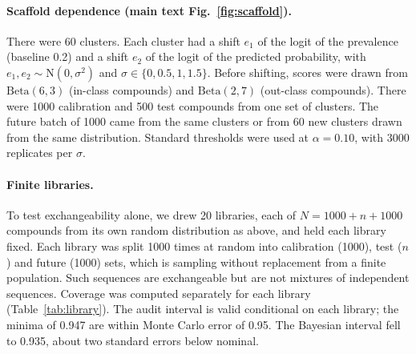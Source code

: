 \documentclass[10pt]{article}
\begin{document}


\paragraph{Scaffold dependence (main text Fig.~\ref{fig:scaffold}).} There were 60 clusters. Each cluster had a shift $e_1$ of the logit of the prevalence (baseline 0.2) and a shift $e_2$ of the logit of the predicted probability, with $e_1,e_2\sim\mathrm N(0,\sigma^2)$ and $\sigma\in\{0,0.5,1,1.5\}$. Before shifting, scores were drawn from $\mathrm{Beta}(6,3)$ (in-class compounds) and $\mathrm{Beta}(2,7)$ (out-class compounds). There were 1000 calibration and 500 test compounds from one set of clusters. The future batch of 1000 came from the same clusters or from 60 new clusters drawn from the same distribution. Standard thresholds were used at $\alpha=0.10$, with 3000 replicates per $\sigma$.

\paragraph{Finite libraries.} To test exchangeability alone, we drew 20 libraries, each of $N=1000+n+1000$ compounds from its own random distribution as above, and held each library fixed. Each library was split 1000 times at random into calibration (1000), test ($n$) and future (1000) sets, which is sampling without replacement from a finite population. Such sequences are exchangeable but are not mixtures of independent sequences.\citep{DiaconisFreedman1980} Coverage was computed separately for each library (Table~\ref{tab:library}). The audit interval is valid conditional on each library; the minima of 0.947 are within Monte Carlo error of 0.95. The Bayesian interval fell to 0.935, about two standard errors below nominal.
\end{document}
